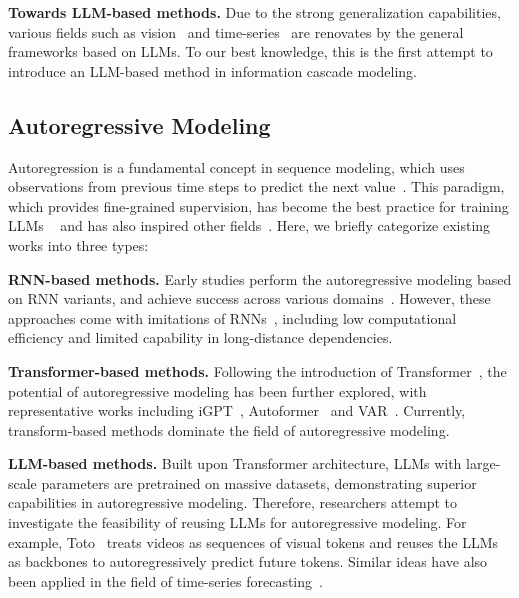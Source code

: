     \noindent \textbf{Towards LLM-based methods.}
    Due to the strong generalization capabilities, various fields such as vision~\cite{awais2025foundation,zhang2024vision} and time-series~\cite{liu2024autotimes,liang2024foundation} are renovates by the general frameworks based on LLMs. 
    To our best knowledge, this is the first attempt to introduce an LLM-based method in information cascade modeling.

\subsection{Autoregressive Modeling}
    Autoregression is a fundamental concept in sequence modeling, which uses observations from previous time steps to predict the next value~\cite{gregor2014deep}.
    This paradigm, which provides fine-grained supervision, has become the best practice for training LLMs ~\cite{radford2019language,achiam2023gpt,bai2023qwen} and has also inspired other fields~\cite{van2016pixel,tian2024visual,rajasegaran2025empirical}.
    Here, we briefly categorize existing works into three types:
    
    \noindent \textbf{RNN-based methods.}
    Early studies perform the autoregressive modeling based on RNN variants, and achieve success across various domains~\cite{ranzato2014video,van2016conditional,van2016pixel}.
    However, these approaches come with imitations of RNNs~\cite{lipton2015critical}, including low computational efficiency and limited capability in long-distance dependencies.
    
    \noindent \textbf{Transformer-based methods.}
    Following the introduction of Transformer~\cite{vaswani2017attention}, the potential of autoregressive modeling has been further explored, with representative works including iGPT~\cite{chen2020generative}, Autoformer~\cite{wu2021autoformer} and VAR~\cite{tian2024visual}.
    Currently, transform-based methods dominate the field of autoregressive modeling.
    
    \noindent \textbf{LLM-based methods.}
    Built upon Transformer architecture, LLMs with large-scale parameters are pretrained on massive datasets, demonstrating superior capabilities in autoregressive modeling.
    Therefore, researchers attempt to investigate the feasibility of reusing LLMs for autoregressive modeling.
    For example, Toto~\cite{rajasegaran2025empirical} treats videos as sequences of visual tokens and reuses the LLMs as backbones to autoregressively predict future tokens.
    Similar ideas have also been applied in the field of time-series forecasting~\cite{liu2024autotimes}.

